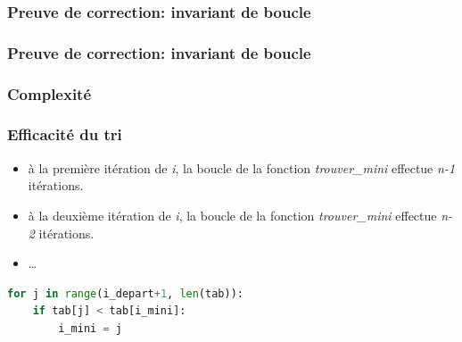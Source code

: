 \documentclass[svgnames,11pt]{beamer}
\begin{document}
\begin{frame}
    \frametitle{Preuve de correction: invariant de boucle}

    \begin{center}
    \label{CODE}
    \end{center}
\end{frame}

\begin{frame}
    \frametitle{Preuve de correction: invariant de boucle}

    \begin{center}
    \label{CODE}
    \end{center}
\end{frame}

\subsubsection{Complexité}
\begin{frame}[fragile]
    \frametitle{Efficacité du tri}

    \begin{itemize}
        \item à la première itération de \emph{i}, la boucle de la fonction \emph{trouver\_mini} effectue \emph{n-1} itérations.
        \item à la deuxième itération de \emph{i}, la boucle de la fonction \emph{trouver\_mini} effectue \emph{n-2} itérations.
        \item \dots
    \end{itemize}
\begin{center}
\begin{lstlisting}[language=Python]
for j in range(i_depart+1, len(tab)):
    if tab[j] < tab[i_mini]:
        i_mini = j
\end{lstlisting}
\end{center}
    
\end{frame}
\end{document}
